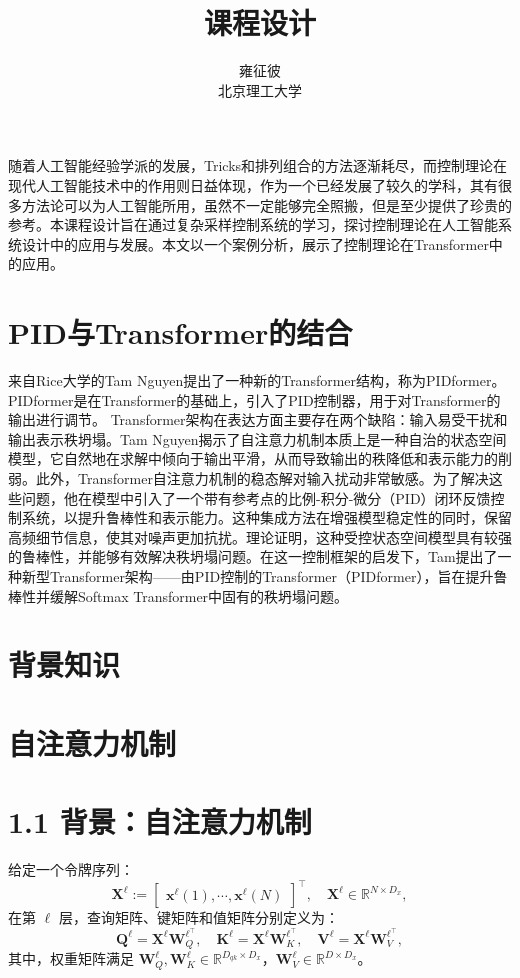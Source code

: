 \documentclass[lang=cn,a4paper,newtx]{elegantpaper}
\title{课程设计}
\author{雍征彼 \\ 北京理工大学}
\institute{}
\date{\zhdate{2024/11/18}}
\begin{document}
\maketitle

随着人工智能经验学派的发展，Tricks和排列组合的方法逐渐耗尽，而控制理论在现代人工智能技术中的作用则日益体现，作为一个已经发展了较久的学科，其有很多方法论可以为人工智能所用，虽然不一定能够完全照搬，但是至少提供了珍贵的参考。本课程设计旨在通过复杂采样控制系统的学习，探讨控制理论在人工智能系统设计中的应用与发展。本文以一个案例分析，展示了控制理论在Transformer中的应用。

\section{PID与Transformer的结合}
来自Rice大学的Tam Nguyen提出了一种新的Transformer结构，称为PIDformer。PIDformer是在Transformer的基础上，引入了PID控制器，用于对Transformer的输出进行调节。
Transformer架构在表达方面主要存在两个缺陷：输入易受干扰和输出表示秩坍塌。Tam Nguyen揭示了自注意力机制本质上是一种自治的状态空间模型，它自然地在求解中倾向于输出平滑，从而导致输出的秩降低和表示能力的削弱。此外，Transformer自注意力机制的稳态解对输入扰动非常敏感。为了解决这些问题，他在模型中引入了一个带有参考点的比例-积分-微分（PID）闭环反馈控制系统，以提升鲁棒性和表示能力。这种集成方法在增强模型稳定性的同时，保留高频细节信息，使其对噪声更加抗扰。理论证明，这种受控状态空间模型具有较强的鲁棒性，并能够有效解决秩坍塌问题。在这一控制框架的启发下，Tam提出了一种新型Transformer架构——由PID控制的Transformer（PIDformer），旨在提升鲁棒性并缓解Softmax Transformer中固有的秩坍塌问题。



\section{背景知识}
\section{自注意力机制}
\section*{1.1 背景：自注意力机制}

给定一个令牌序列：
\[
\mathbf{X}^{\ell} := 
\begin{bmatrix}
\mathbf{x}^{\ell}(1), \cdots, \mathbf{x}^{\ell}(N)
\end{bmatrix}^\top, \quad 
\mathbf{X}^{\ell} \in \mathbb{R}^{N \times D_x},
\]
在第 $\ell$ 层，查询矩阵、键矩阵和值矩阵分别定义为：
\[
\mathbf{Q}^{\ell} = \mathbf{X}^\ell \mathbf{W}_Q^{\ell^\top}, \quad
\mathbf{K}^{\ell} = \mathbf{X}^\ell \mathbf{W}_K^{\ell^\top}, \quad
\mathbf{V}^{\ell} = \mathbf{X}^\ell \mathbf{W}_V^{\ell^\top},
\]
其中，权重矩阵满足 $\mathbf{W}_Q^{\ell}, \mathbf{W}_K^{\ell} \in \mathbb{R}^{D_{qk} \times D_x}$，$\mathbf{W}_V^{\ell} \in \mathbb{R}^{D \times D_x}$。
\end{document}
